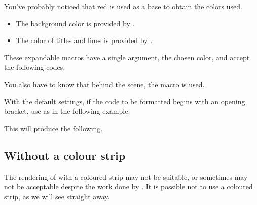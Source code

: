 \begin{tdocnote}
    You've probably noticed that red is used as a base to obtain the colors used.
    
    \begin{itemize}
    	\item The background color is provided by .

    	\item The color of titles and lines is provided by .
    \end{itemize}
    
    These expandable macros have a single argument, the chosen color, and accept the following codes.

    \begin{tdoclatex}[code]
    \end{tdoclatex}
    
    You also have to know that behind the scene, the  macro is used.

    \begin{tdoclatex}[std]
    \end{tdoclatex}
\end{tdocnote}




\begin{tdocwarn}
    With the default settings, if the code to be formatted begins with an opening bracket, use  as in the following example.



    This will produce the following.
\end{tdocwarn}






\subsection{Without a colour strip}

The rendering of  with a coloured strip may not be suitable, or sometimes may not be acceptable despite the work done by .
It is possible not to use a coloured strip, as we will see straight away.


